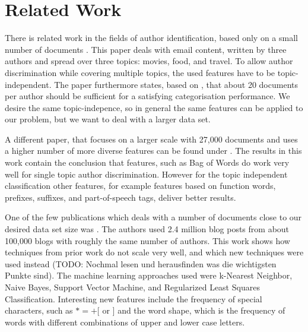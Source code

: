 
\section{Related Work}
\label{sec:related}
There is related work in the fields of author identification, based only on a small number of documents \cite{de2001mining}.
This paper deals with email content, written by three authors and spread over three topics: movies, food, and travel.
To allow author discrimination while covering multiple topics, the used features have to be topic-independent.
The paper furthermore states, based on \cite{corney2001identifying}, that about 20 documents per author should be sufficient for a satisfying categorisation performance.
We desire the same topic-indepence, so in general the same features can be applied to our problem, but we want to deal with a larger data set.


A different paper, that focuses on a larger scale with 27,000 documents and uses a higher number of more diverse features can be found under \cite{madigan2005author}.
The results in this work contain the conclusion that features, such as Bag of Words do work very well for single topic author discrimination.
However for the topic independent classification other features, for example features based on function words, prefixes, suffixes, and part-of-speech tags, deliver better results. 


One of the few publications which deals with a number of documents close to our desired data set size was \cite{narayanan2012feasibility}.
The authors used 2.4 million blog posts from about 100,000 blogs with roughly the same number of authors.
This work shows how techniques from prior work do not scale very well, and which new techniques were used instead (TODO: Nochmal lesen und herausfinden was die wichtigsten Punkte sind).
The machine learning approaches used were k-Nearest Neighbor, Naive Bayes, Support Vector Machine, and Regularized Least Squares Classification.
Interesting new features include the frequency of special characters, such as $*=+[$ or $]$ and the word shape, which is the frequency of words with different combinations of upper and lower case letters.
